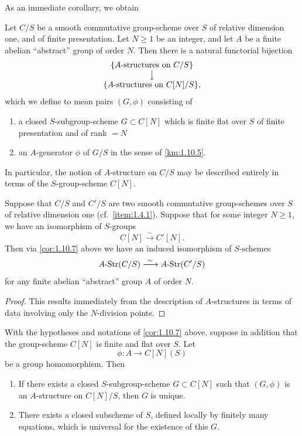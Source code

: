 As an immediate corollary, we obtain

\begin{corollary}\label{cor:1.10.7}
Let $C/S$ be a smooth commutative group-scheme over $S$ of relative dimension one, and of finite presentation. Let $N \ge 1$ be an integer, and let $A$ be a finite abelian ``abstract'' group of order $N$. Then there is a natural functorial bijection
\[
\begin{array}{c}
\{A\text{-structures on } C/S\} \\
\big\downarrow \\
\{A\text{-structures on } C[N]/S\},
\end{array}
\]
which we define to mean pairs $(G, \phi)$ consisting of
\begin{enumerate}[(1)]
\item a closed $S$-subgroup-scheme $G \subset C[N]$ which is finite flat over $S$ of finite presentation and of rank $= N$
\item an $A$-generator $\phi$ of $G/S$ in the sense of \ref{km:1.10.5}.
\end{enumerate}
In particular, the notion of $A$-structure on $C/S$ may be described entirely in terms of the $S$-group-scheme $C[N]$.
\end{corollary}

\begin{corollary}\label{cor:1.10.8}
Suppose that $C/S$ and $C'/S$ are two smooth commutative group-schemes over $S$ of relative dimension one (cf.~\ref{item:1.4.1}). Suppose that for some integer $N \ge 1$, we have an isomorphism of $S$-groups
\[
C[N] \xrightarrow{\ \sim\ } C'[N].
\]
Then via \ref{cor:1.10.7} above we have an induced isomorphism of $S$-schemes
\[
A\text{\rm -Str}(C/S) \xrightarrow{\ \sim\ } A\text{\rm -Str}(C'/S)
\]
for any finite abelian ``abstract'' group $A$ of order $N$.
\end{corollary}

\begin{proof}
This results immediately from the description of $A$-structures in terms of data involving only the $N$-division points.
\end{proof}

\begin{corollary}\label{cor:1.10.9}
With the hypotheses and notations of \ref{cor:1.10.7} above, suppose in addition that the group-scheme $C[N]$ is finite and flat over $S$. Let
\[
\phi \colon A \longrightarrow C[N](S)
\]
be a group homomorphism. Then
\begin{enumerate}[(1)]
\item If there exists a closed $S$-subgroup-scheme $G \subset C[N]$ such that $(G, \phi)$ is an $A$-structure on $C[N]/S$, then $G$ is unique.
\item There exists a closed subscheme of $S$, defined locally by finitely many equations, which is universal for the existence of this $G$.
\end{enumerate}
\end{corollary}

